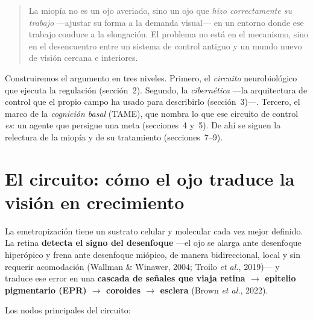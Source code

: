 \documentclass[11pt,a4paper]{article}
\begin{document}
\begin{quote}
La miopía no es un ojo averiado, sino un ojo que \emph{hizo correctamente su trabajo} ---ajustar su forma a la demanda visual--- en un entorno donde ese trabajo conduce a la elongación. El problema no está en el mecanismo, sino en el desencuentro entre un sistema de control antiguo y un mundo nuevo de visión cercana e interiores.
\end{quote}

Construiremos el argumento en tres niveles. Primero, el \emph{circuito} neurobiológico que ejecuta la regulación (sección~2). Segundo, la \emph{cibernética} ---la arquitectura de control que el propio campo ha usado para describirlo (sección~3)---. Tercero, el marco de la \emph{cognición basal} (TAME), que nombra lo que ese circuito de control \emph{es}: un agente que persigue una meta (secciones~4 y~5). De ahí se siguen la relectura de la miopía y de su tratamiento (secciones~7--9).

\section{El circuito: cómo el ojo traduce la visión en crecimiento}

La emetropización tiene un sustrato celular y molecular cada vez mejor definido. La retina \textbf{detecta el signo del desenfoque} ---el ojo se alarga ante desenfoque hiperópico y frena ante desenfoque miópico, de manera bidireccional, local y sin requerir acomodación (Wallman \& Winawer, 2004; Troilo \emph{et al.}, 2019)--- y traduce ese error en una \textbf{cascada de señales que viaja retina $\rightarrow$ epitelio pigmentario (EPR) $\rightarrow$ coroides $\rightarrow$ esclera} (Brown \emph{et al.}, 2022).

Los nodos principales del circuito:
\end{document}
